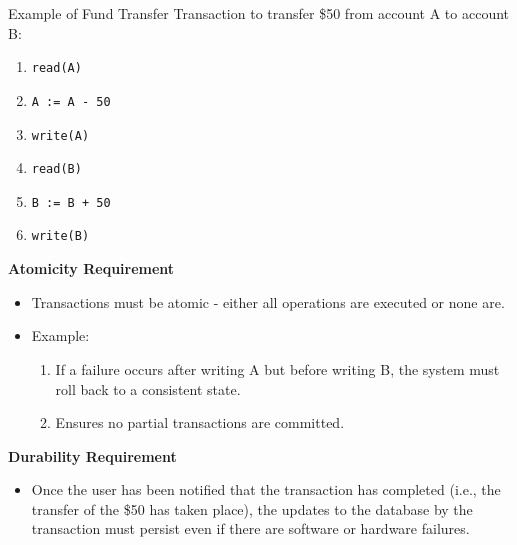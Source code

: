 \documentclass{beamer}
\begin{document}
\begin{frame}{Example of Fund Transfer}
    \scriptsize
    Transaction to transfer \$50 from account A to account B:
    \begin{enumerate}
        \item \texttt{read(A)}
        \item \texttt{A := A - 50}
        \item \texttt{write(A)}
        \item \texttt{read(B)}
        \item \texttt{B := B + 50}
        \item \texttt{write(B)}
    \end{enumerate}

    \textbf{Atomicity Requirement}
    \begin{itemize}
        \item Transactions must be atomic - either all operations are executed or none are.
        \item Example:
        \begin{enumerate}
            \scriptsize
            \item If a failure occurs after writing A but before writing B, the system must roll back to a consistent state.
            \item Ensures no partial transactions are committed.
        \end{enumerate}
    \end{itemize}

    \textbf{Durability Requirement}
    \begin{itemize}
        \item Once the user has been notified that the transaction has completed (i.e., the transfer of the \$50 has taken place), the updates to the database by the transaction must persist even if there are software or hardware failures.
    \end{itemize}

\end{frame}
\end{document}
